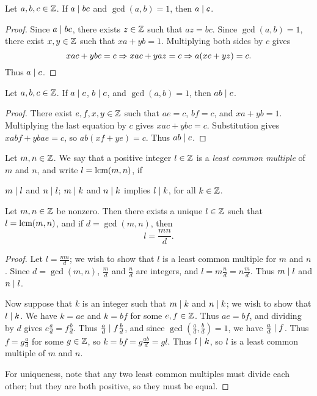 \documentclass{amsart}
\begin{document}
\begin{Prop}
Let $a,b,c \in \mathbb{Z}$.  If $a \mid bc$ and $\gcd(a,b) = 1$, then $a \mid c$.
\end{Prop}

\begin{proof}
Since $a \mid bc$, there exists $z \in \mathbb{Z}$ such that $az = bc$.
Since $\gcd(a,b) = 1$, there exist $x,y \in \mathbb{Z}$ such that $xa + yb = 1$.
Multiplying both sides by $c$ gives
\[ xac + ybc = c \Rightarrow xac + yaz = c \Rightarrow a(xc+yz) = c . \]
Thus $a \mid c$.
\end{proof}

\begin{Prop}
Let $a,b,c \in \mathbb{Z}$.  If $a \mid c$, $b \mid c$, and $\gcd(a,b) = 1$, then $ab \mid c$.
\end{Prop}

\begin{proof}
There exist $e,f,x,y \in \mathbb{Z}$ such that $ae = c$, $bf = c$, and $xa + yb = 1$.
Multiplying the last equation by $c$ gives $xac + ybc = c$.
Substitution gives $xabf + ybae = c$, so $ab(xf+ye) = c$.
Thus $ab \mid c$.
\end{proof}

\begin{Def}
Let $m,n \in \mathbb{Z}$.  We say that a positive integer $l \in \mathbb{Z}$ is a {\em least common multiple}
of $m$ and $n$, and write $l = \text{\rm{lcm}}(m,n)$, if
\begin{itemize}
 $m \mid l$ and $n \mid l$;
 $m \mid k$ and $n \mid k$ implies $l \mid k$, for all $k \in \mathbb{Z}$.
\end{itemize}
\end{Def}

\begin{Prop}
Let $m,n \in \mathbb{Z}$ be nonzero. Then there exists a unique $l \in \mathbb{Z}$
such that $l = \text{\rm{lcm}}(m,n)$, and if $d = \gcd(m,n)$, then
\[ l = \frac{mn}{d} . \]
\end{Prop}

\begin{proof}
Let $l = \frac{mn}{d}$; we wish to show that $l$ is a least common multiple for $m$ and $n$.
Since $d = \gcd(m,n)$, $\frac{m}{d}$ and $\frac{n}{d}$ are integers,
and $l = m \frac{n}{d} = n \frac{m}{d}$. Thus $m \mid l$ and $n \mid l$.

Now suppose that $k$ is an integer such that $m \mid k$ and $n \mid k$;
we wish to show that $l \mid k$.
We have $k = ae$ and $k = bf$ for some $e,f \in \mathbb{Z}$.  Thus $ae = bf$,
and dividing by $d$ gives $e \frac{a}{d} = f \frac{b}{d}$.
Thus $\frac{a}{d} \mid f \frac{b}{d}$, and since $\gcd(\frac{a}{d},\frac{b}{d}) = 1$,
we have $\frac{a}{d} \mid f$.
Thus $f = g \frac{a}{d}$ for some $g \in \mathbb{Z}$, so $k = bf = g \frac{ab}{d} = gl$.
Thus $l \mid k$, so $l$ is a least common multiple of $m$ and $n$.

For uniqueness, note that any two least common multiples must divide each other;
but they are both positive, so they must be equal.
\end{proof}
\end{document}
